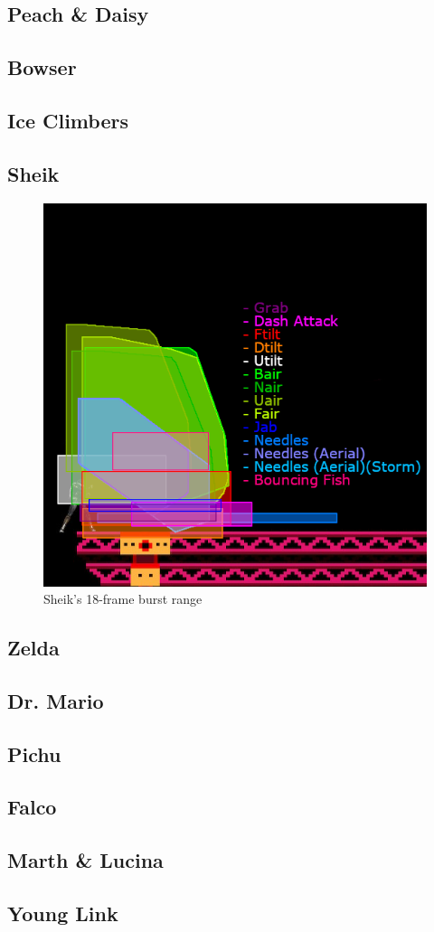 \begin{multicols}{2}
\subsection{Peach \& Daisy}
\subsection{Bowser}
\subsection{Ice Climbers}
\subsection{Sheik}
\begin{figure}[H]
    \centering
    \includegraphics[width=.45\textwidth]{images/burst-ranges/sheik}
    \caption{Sheik's 18-frame burst range\cite{ref:burst-range:sheik}}
\end{figure}

\subsection{Zelda}
\subsection{Dr. Mario}
\subsection{Pichu}
\subsection{Falco}
\subsection{Marth \& Lucina}
\subsection{Young Link}

\end{multicols}
